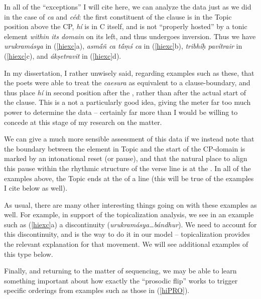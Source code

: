 \documentclass[output=paper,
modfonts
]{LSP/langsci}
\begin{document}
\noindent In all of the ``exceptions'' I will cite here, we can analyze the data just as we did in the case of
\textit{ca} and \textit{céd}: the first constituent of the clause is in the Topic position
above the CP, \textit{hí} is in C itself, and is not ``properly hosted'' by a tonic element \textit{within
its domain} on its left, and thus undergoes inversion. Thus we have {\ob} \textit{urukramásya}{\cb}
in (\ref{hiexc}a), {\ob} \textit{asmā́ñ ca tā́ṃś ca}{\cb} in (\ref{hiexc}b), {\ob} \textit{tribhíḥ pavítrair}{\cb}
in (\ref{hiexc}c), and {\ob} \textit{ákṣetravit}{\cb} in (\ref{hiexc}d).

In my dissertation, I rather unwisely said, regarding examples such as these, that the poets were able to
treat the \textit{caesura} as equivalent to a clause-boundary, and thus place \textit{hí} in second
position after the , rather than after the actual start of the clause. This is a not a particularly good idea, giving
the meter far too much power to determine the data -- certainly far more than I would be willing to concede at this 
stage of  my research on the matter.

We can give a much more sensible assessment of this data if we instead note that the boundary between the element
in Topic and the start of the CP-domain is marked by an intonational reset (or pause), and that the natural
place to align this pause within the rhythmic structure of the verse line is at the . In all of the examples
above, the Topic ends at the  of a  line (this will be true of the examples I cite below
as well).

As usual, there are many other interesting things going on with these examples as well. For example, in support of the
topicalization analysis, we see in an example such as (\ref{hiexc}a) a discontinuity (\textit{urukramásya\ldots bándhur}).
We need to account for this discontinuity, and  is the way to do it in our model -- topicalization provides
the relevant explanation for that movement. We will see additional
examples of this type below.

Finally, and returning to the matter of  sequencing, we may be able to learn something important about how exactly the ``prosodic flip'' works to trigger specific orderings from examples
such as those in (\ref{hiPRO}).

\end{document}
